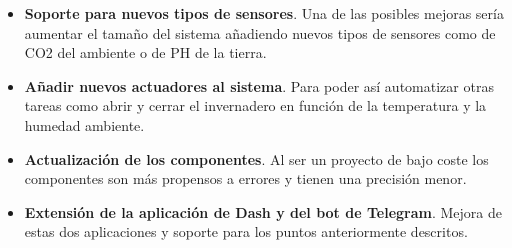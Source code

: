 \documentclass[a4paper, 12pt, oneside]{book}
\begin{document}
\begin{itemize}
\item \textbf{Soporte para nuevos tipos de sensores}. Una de las posibles mejoras sería aumentar el tamaño del sistema añadiendo nuevos tipos de sensores como de CO2 del ambiente o de PH de la tierra.

\item \textbf{Añadir nuevos actuadores al sistema}. Para poder así automatizar otras tareas como abrir y cerrar el invernadero en función de la temperatura y la humedad ambiente.

\item \textbf{Actualización de los componentes}. Al ser un proyecto de bajo coste los componentes son más propensos a errores y tienen una precisión menor.

\item \textbf{Extensión de la aplicación de Dash y del bot de Telegram}. Mejora de estas dos aplicaciones y soporte para los puntos anteriormente descritos. \cite{historia} 

\end{itemize}


\cleardoublepage
\end{document}
